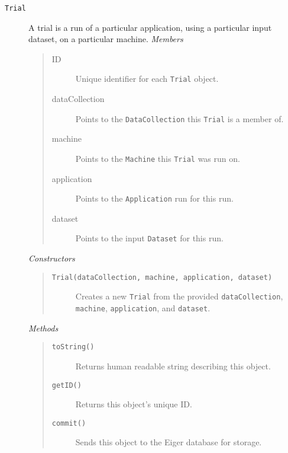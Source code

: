 \begin{description}
\item[\texttt{Trial}] A trial is a run of a particular application, using a particular input dataset, on a particular machine.
  {\em Members}
	\begin{quote}
	\begin{description}
    \item[ID] Unique identifier for each \texttt{Trial} object.
    \item[dataCollection] Points to the \texttt{DataCollection} this \texttt{Trial} is a member of.
    \item[machine] Points to the \texttt{Machine} this \texttt{Trial} was run on.
    \item[application] Points to the \texttt{Application} run for this run.
    \item[dataset] Points to the input \texttt{Dataset} for this run.
	\end{description}
	\end{quote}
  {\em Constructors}
	\begin{quote}
	\begin{description}
    \item[\texttt{Trial(dataCollection, machine, application, dataset)}] Creates a new \texttt{Trial} from the provided \texttt{dataCollection}, \texttt{machine}, \texttt{application}, and \texttt{dataset}.
	\end{description}
	\end{quote}
	{\em Methods}
	\begin{quote}
	\begin{description}
		\item[\texttt{toString()}] Returns human readable string describing this object.
		\item[\texttt{getID()}] Returns this object's unique ID.
	\item[\texttt{commit()}] Sends this object to the Eiger database for storage.
	\end{description}
	\end{quote}


\end{description}
